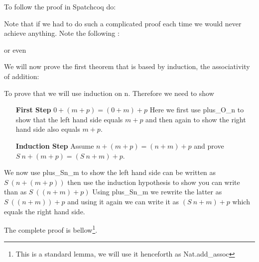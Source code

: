 To follow the proof in Spatchcoq do:


  
Note that if we had to do such a complicated proof each time we would never achieve anything.  Note the following :



or even




  
  We will now prove the first theorem that is based by induction, the associativity of addition:
  
  
  
  
To prove that we will use induction on n. Therefore we need to show
  
  
  
  
  \begin{enumerate}
  \item[\bf First Step] $0+(m+p)= (0+m)+p$
  Here we first use plus\_O\_n to show that the left hand side equals $m+p$ and then again to show the right hand side also equals $m+p$.
  
  
  
  
  \item [\bf Induction Step] Assume $n+(m+p)=(n+m)+p$ and prove $S\ n +(m+p) = ( S\ n+m)+p$.
  \end{enumerate}
  
We now use plus\_Sn\_m  to show the left hand side can be written as $S\ (n +(m+p))$ then use the induction hypothesis to show you can write than as  $S \ ((n+m)+p)$ Using plus\_Sn\_m we rewrite the latter as $S \ ((n+m))+ p $ and using it again we can write it as $(S \ n +m) +p$ which equals the right hand side.

The complete proof is bellow\footnote{This is a standard lemma, we will use it henceforth as Nat.add\_assoc}.

  
  
